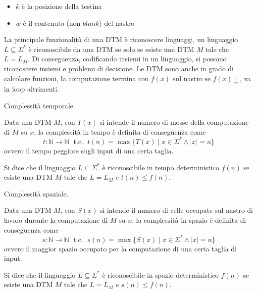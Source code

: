 \documentclass[12pt, answers]{exam}
\theoremstyle{plain}
\newcommand{\tc}{\; \text{ t.c. } \;}
\newcommand{\N}{\mathbb{N}}
\begin{document}
\begin{questions}
\begin{solution}
\begin{itemize}
                \item $k$ è la posizione della testina
                
                \item $w$ è il contenuto (non $blank$) del nastro
            \end{itemize}
            
            La principale funzionalità di una DTM è riconoscere linguaggi, un linguaggio $L \subseteq \Sigma^\ast$ è riconoscibile da una DTM se solo se esiste una DTM $M$ tale che $L = L_M$. Di conseguenza, codificando insiemi in un linguaggio, si possono riconoscere insiemi e problemi di decisione. Le DTM sono anche in grado di calcolare funzioni, la computazione termina con $f(x)$ sul nastro se $f(x) \downarrow$, va in loop altrimenti.
        \end{solution}
        
        \question Complessità temporale.
        
        \begin{solution}
            Data una DTM $M$, con $T(x)$ si intende il numero di mosse della computazione di $M$ su $x$, la complessità in tempo è definita di conseguenza come
            $$ t: \N \rightarrow \N \tc t(n) = \max \{T(x) \mid x \in \Sigma^\ast \wedge |x| = n\} $$
            ovvero il tempo peggiore sugli input di una certa taglia. 
            
            Si dice che il linguaggio $L \subseteq \Sigma^\ast$ è riconoscibile in tempo deterministico $f(n)$ se esiste una DTM $M$ tale che $L = L_M$ e $t(n) \leq f(n)$.
        \end{solution}
        
        \question Complessità spaziale.
        
        \begin{solution}
            Data una DTM $M$, con $S(x)$ si intende il  numero di celle occupate sul nastro di lavoro durante la computazione di $M$ su $x$, la complessità in spazio è definita di conseguenza come
            $$ s: \N \rightarrow \N \tc s(n) = \max \{S(x) \mid x \in \Sigma^\ast \wedge |x| = n \} $$
            ovvero il maggior spazio occupato per la computazione di una certa taglia di input.
            
            Si dice che il linguaggio $L \subseteq \Sigma^\ast$ è riconoscibile in spazio deterministico $f(n)$ se esiste una DTM $M$ tale che $L = L_M$ e $s(n) \leq f(n)$.
        \end{solution}
        

\end{questions}
\end{document}
